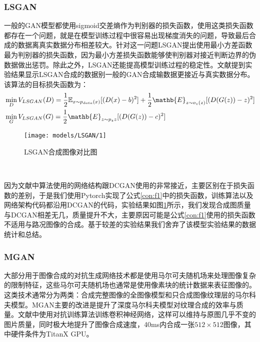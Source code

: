 \subsubsection{LSGAN}

 一般的GAN模型都使用sigmoid交差熵作为判别器的损失函数，使用这类损失函数都存在一个问题，就是在模型训练过程中很容易出现梯度消失的问题，导致最后合成的数据离真实数据分布相差较大。针对这一问题LSGAN提出使用最小方差函数最为判别器的损失函数，因为最小方差损失函数能够使判别器对接近判断边界的伪数据做出惩罚。除此之外，LSGAN还能提高模型训练过程的稳定性。文献\cite{LSGAN}提到实验结果显示LSGAN合成的数据别一般的GAN合成输数据更接近与真实数据分布。该算法的目标损失函数为：
\begin{equation}
\begin{aligned}
    & \min_D V_{LSGAN}(D)=\frac{1}{2}\mathbb{E}_{x\sim p_{data}(x)}[(D(x)-b)^2]+\frac{1}{2}\mathb{E}_{z\sim o_z(z)}[(D(G(z))-z)^2] \\
    & \min_G V_{LSGAN}(G)=\frac{1}{2}\mathb{E}_{z\sim p_z{z}}[(D(G(z))-c)^2]
\end{aligned}
\label{con:f1}
\end{equation}

\begin{figure}[h]
    \centering
    \texttt{[image: models/LSGAN/1]}
    \caption{LSGAN合成图像对比图}
    \label{fig:lsgan}
\end{figure}　

因为文献\cite{LSGAN}中算法使用的网络结构跟DCGAN\cite{dcgan}使用的非常接近，主要区别在于损失函数的差别，于是我们使用Pytorch实现了公式\ref{con:f1}中的损失函数，训练算法以及网络架构代码都沿用DCGAN的代码，实验结果如图\ref{fig:lsgan}所示，我们发现合成图质量与DCGAN相差无几，质量提升不大，主要原因可能是公式\ref{con:f1}使用的损失函数不适用与路况图像的合成。基于较差的实验结果我们舍弃了该模型实验结果的数据统计和总结。

\subsubsection{MGAN}

 大部分用于图像合成的对抗生成网络技术都是使用马尔可夫随机场来处理图像复杂的限制特征，这些马尔可夫随机场也通常是使用像素块的统计数据来表征图像的。这类技术通常分为两类：合成完整图像的全图像模型和只合成图像纹理层的马尔科夫模型。MGAN主要的改进是提升了深度马尔科夫模型对纹理合成的效率与质量。文献\cite{MGAN}中使用对抗训练\cite{adtrain}算法训练卷积神经网络，这样可以维持与原图几乎不变的图片质量，同时极大地提升了图像合成速度，40ms内合成一张$512\times 512$图像，其中硬件条件为TitanX GPU。

